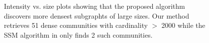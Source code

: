 \begin{figure}[h!]
  \vspace{-1em}
  \centering
  \def\figsep{.2cm}
  \def\dist{1}
  \def\disty{.9}
  \begin{subfigure}[b]{.24\textwidth}
  \end{subfigure}
  \hfill
  \begin{subfigure}[b]{.24\textwidth}
  \end{subfigure}
  \caption{Intensity vs. size plots showing that the proposed algorithm discovers more densest subgraphts of
	  large sizes. Our method retrieves 51 dense communities with cardinality $>$ 2000 while
	  the SSM algorithm in \cite{nagano2011size} only finds 2 such communities.}
  \label{fig:cnr-2000}
  \label{fig:cnr-2000}
\end{figure}

